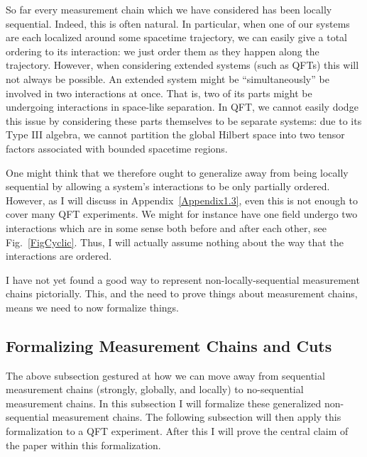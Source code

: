 \documentclass[12pt,prd,superscriptaddress,floatfix,amsmath,amssymb,amsfonts,nofootinbib]{revtex4-2}
\begin{document}

So far every measurement chain which we have considered has been locally sequential. Indeed, this is often natural. In particular, when one of our systems are each localized around some spacetime trajectory, we can easily give a total ordering to its interaction: we just order them as they happen along the trajectory. However, when considering extended systems (such as QFTs) this will not always be possible. An extended system might be ``simultaneously'' be involved in two interactions at once. That is, two of its parts might be undergoing interactions in space-like separation. In QFT, we cannot easily dodge this issue by considering these parts themselves to be separate systems: due to its Type III algebra, we cannot partition the global Hilbert space into two tensor factors associated with bounded spacetime regions. 

One might think that we therefore ought to generalize away from being locally sequential by allowing a system's interactions to be only partially ordered. However, as I will discuss in Appendix~\ref{Appendix1.3}, even this is not enough to cover many QFT experiments. We might for instance have one field undergo two interactions which are in some sense both before and after each other, see Fig.~\ref{FigCyclic}. Thus, I will actually assume nothing about the way that the interactions are ordered.

I have not yet found a good way to represent non-locally-sequential measurement chains pictorially. This, and the need to prove things about measurement chains, means we need to now formalize things.

\subsection{Formalizing Measurement Chains and Cuts}
The above subsection gestured at how we can move away from sequential measurement chains (strongly, globally, and locally) to no-sequential measurement chains. In this subsection I will formalize these generalized non-sequential measurement chains. The following subsection will then apply this formalization to a QFT experiment. After this I will prove the central claim of the paper within this formalization.
\end{document}
